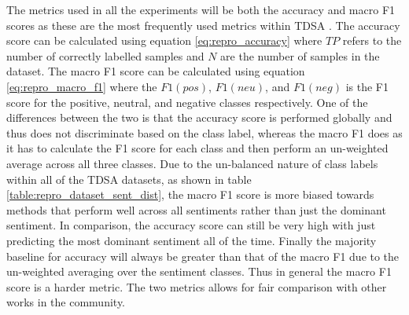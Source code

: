 
The metrics used in all the experiments will be both the accuracy and macro F1 scores as these are the most frequently used metrics within TDSA \citep{dong-etal-2014-adaptive,wang-etal-2017-tdparse,he-etal-2018-exploiting}. The accuracy score can be calculated using equation \ref{eq:repro_accuracy} where $TP$ refers to the number of correctly labelled samples and $N$ are the number of samples in the dataset. The macro F1 score can be calculated using equation \ref{eq:repro_macro_f1} where the $F1(pos)$, $F1(neu)$, and $F1(neg)$ is the F1 score for the positive, neutral, and negative classes respectively. One of the differences between the two is that the accuracy score is performed globally and thus does not discriminate based on the class label, whereas the macro F1 does as it has to calculate the F1 score for each class and then perform an un-weighted average across all three classes. Due to the un-balanced nature of class labels within all of the TDSA datasets, as shown in table \ref{table:repro_dataset_sent_dist}, the macro F1 score is more biased towards methods that perform well across all sentiments rather than just the dominant sentiment. In comparison, the accuracy score can still be very high with just predicting the most dominant sentiment all of the time. Finally the majority baseline for accuracy will always be greater than that of the macro F1 due to the un-weighted averaging over the sentiment classes. Thus in general the macro F1 score is a harder metric. The two metrics allows for fair comparison with other works in the community.

